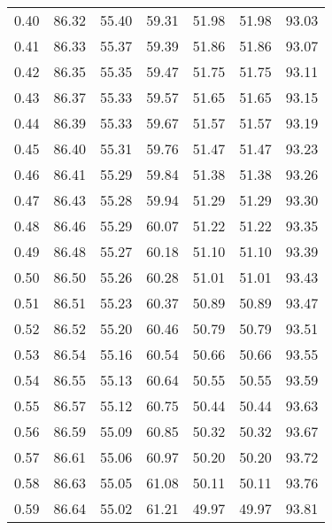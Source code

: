 \begin{tabular}{|c|c|c|c|c|c|c|}
      0.40 &     86.32 &     55.40 &      59.31 &   51.98 &      51.98 &         93.03 \\
      0.41 &     86.33 &     55.37 &      59.39 &   51.86 &      51.86 &         93.07 \\
      0.42 &     86.35 &     55.35 &      59.47 &   51.75 &      51.75 &         93.11 \\
      0.43 &     86.37 &     55.33 &      59.57 &   51.65 &      51.65 &         93.15 \\
      0.44 &     86.39 &     55.33 &      59.67 &   51.57 &      51.57 &         93.19 \\
      0.45 &     86.40 &     55.31 &      59.76 &   51.47 &      51.47 &         93.23 \\
      0.46 &     86.41 &     55.29 &      59.84 &   51.38 &      51.38 &         93.26 \\
      0.47 &     86.43 &     55.28 &      59.94 &   51.29 &      51.29 &         93.30 \\
      0.48 &     86.46 &     55.29 &      60.07 &   51.22 &      51.22 &         93.35 \\
      0.49 &     86.48 &     55.27 &      60.18 &   51.10 &      51.10 &         93.39 \\
      0.50 &     86.50 &     55.26 &      60.28 &   51.01 &      51.01 &         93.43 \\
      0.51 &     86.51 &     55.23 &      60.37 &   50.89 &      50.89 &         93.47 \\
      0.52 &     86.52 &     55.20 &      60.46 &   50.79 &      50.79 &         93.51 \\
      0.53 &     86.54 &     55.16 &      60.54 &   50.66 &      50.66 &         93.55 \\
      0.54 &     86.55 &     55.13 &      60.64 &   50.55 &      50.55 &         93.59 \\
      0.55 &     86.57 &     55.12 &      60.75 &   50.44 &      50.44 &         93.63 \\
      0.56 &     86.59 &     55.09 &      60.85 &   50.32 &      50.32 &         93.67 \\
      0.57 &     86.61 &     55.06 &      60.97 &   50.20 &      50.20 &         93.72 \\
      0.58 &     86.63 &     55.05 &      61.08 &   50.11 &      50.11 &         93.76 \\
      0.59 &     86.64 &     55.02 &      61.21 &   49.97 &      49.97 &         93.81 \\

\end{tabular}
